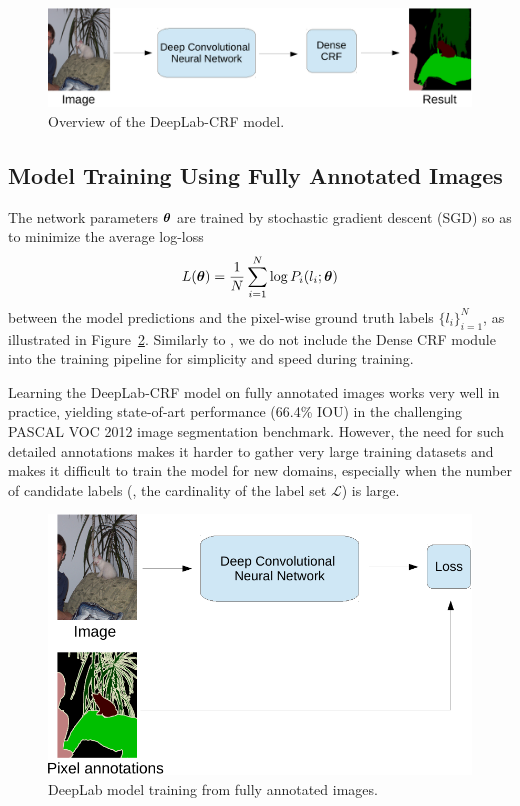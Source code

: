 \begin{figure}[tbp!]
  \centering
  \includegraphics[width=0.9\linewidth]{fig/model_test.pdf} 
  \caption{Overview of the DeepLab-CRF model.}
  \label{fig:model_test}
\end{figure}

\subsection{Model Training Using Fully Annotated Images}
\label{sec:train_pixel}

The network parameters $\boldsymbol{\theta}$ are trained by stochastic gradient
descent (SGD) so as to minimize the average log-loss 
\begin{equation}
  \label{eq:log_loss}
  L(\boldsymbol{\theta}) = \frac{1}{N} \sum_{i = 1}^N \log P_i(l_i; \boldsymbol{\theta})
\end{equation}
between the model predictions and the pixel-wise ground truth
labels $\{l_i\}_{i = 1}^N$, as illustrated in
Figure~\ref{fig:model_train_pixel}. Similarly to
\citet{chen2014semantic}, we do not include the Dense CRF module into
the training pipeline for simplicity and speed during training.

Learning the DeepLab-CRF model on fully annotated images works very
well in practice, yielding state-of-art performance (66.4\% IOU) in
the challenging PASCAL VOC 2012 image segmentation benchmark. However,
the need for such detailed annotations makes it harder to gather very
large training datasets and makes it difficult to train the model
for new domains, especially when the number of candidate labels
(\ie, the cardinality of the label set $\mathcal{L}$) is large.

\begin{figure}[htbp!]
  \centering
  \includegraphics[width=0.9\linewidth]{fig/model_train_pixel.pdf} 
  \caption{DeepLab model training from fully annotated images.}
  \label{fig:model_train_pixel}
\end{figure}

